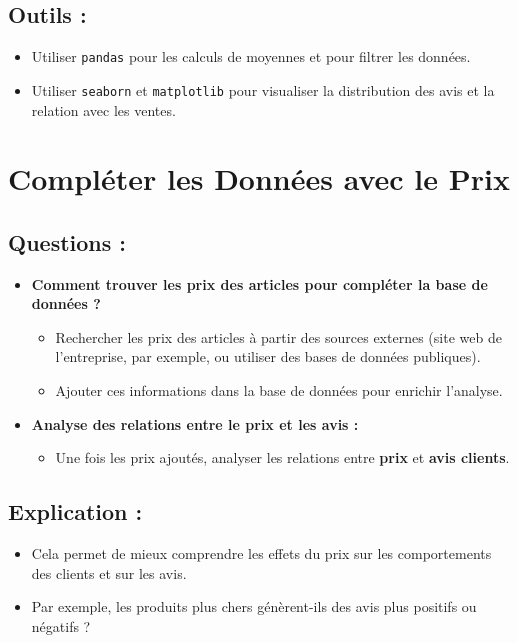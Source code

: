 \documentclass{article}
\begin{document}
	\subsection{Outils :}
	\begin{itemize}
		\item Utiliser \texttt{pandas} pour les calculs de moyennes et pour filtrer les données.
		\item Utiliser \texttt{seaborn} et \texttt{matplotlib} pour visualiser la distribution des avis et la relation avec les ventes.
	\end{itemize}
	
	\section{Compléter les Données avec le Prix}
	
	\subsection{Questions :}
	\begin{itemize}
		\item \textbf{Comment trouver les prix des articles pour compléter la base de données ?}
		\begin{itemize}
			\item Rechercher les prix des articles à partir des sources externes (site web de l’entreprise, par exemple, ou utiliser des bases de données publiques).
			\item Ajouter ces informations dans la base de données pour enrichir l’analyse.
		\end{itemize}
		
		\item \textbf{Analyse des relations entre le prix et les avis :}
		\begin{itemize}
			\item Une fois les prix ajoutés, analyser les relations entre \textbf{prix} et \textbf{avis clients}.
		\end{itemize}
	\end{itemize}
	
	\subsection{Explication :}
	\begin{itemize}
		\item Cela permet de mieux comprendre les effets du prix sur les comportements des clients et sur les avis.
		\item Par exemple, les produits plus chers génèrent-ils des avis plus positifs ou négatifs ?
	\end{itemize}
	
\end{document}

